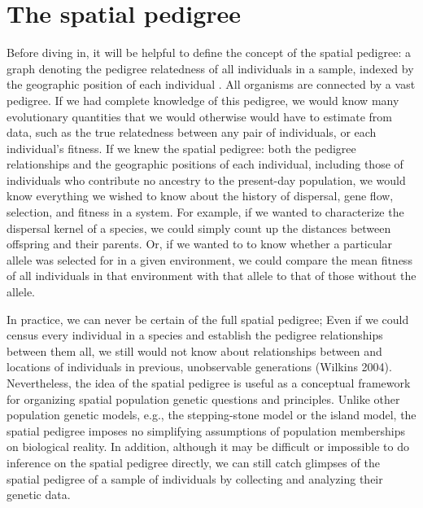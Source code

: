 \documentclass{ar-1col}
\begin{document}
\section{The spatial pedigree}
Before diving in,
it will be helpful to define the concept of the spatial pedigree:
a graph denoting the pedigree relatedness of all individuals in a sample,
indexed by the geographic position of each individual .
All organisms are connected by a vast pedigree.
If we had complete knowledge of this pedigree,
we would know many evolutionary quantities
that we would otherwise would have to estimate from data,
such as the true relatedness between any pair of individuals,
or each individual's fitness.
If we knew the spatial pedigree:
both the pedigree relationships
and the geographic positions of each individual,
including those of individuals
who contribute no ancestry to the present-day population,
we would know everything we wished to know about
the history of dispersal, gene flow,
selection, and fitness in a system.
For example, if we wanted to characterize the dispersal kernel of a species,
we could simply count up the distances between offspring and their parents.
Or, if we wanted to to know whether a particular allele
was selected for in a given environment,
we could compare the mean fitness of all individuals in that environment with that allele
to that of those without the allele.

In practice, we can never be certain of the full spatial pedigree;
Even if we could census every individual in a species
and establish the pedigree relationships between them all,
we still would not know about relationships between
and locations of individuals in previous, unobservable generations (Wilkins 2004).
Nevertheless, the idea of the spatial pedigree is useful
as a conceptual framework for organizing
spatial population genetic questions and principles.
Unlike other population genetic models,
e.g., the stepping-stone model or the island model,
the spatial pedigree imposes no simplifying
assumptions of population memberships on biological reality.
In addition, although it may be difficult or impossible
to do inference on the spatial pedigree directly,
we can still catch glimpses of the spatial pedigree of a sample of individuals
by collecting and analyzing their genetic data.
\end{document}
